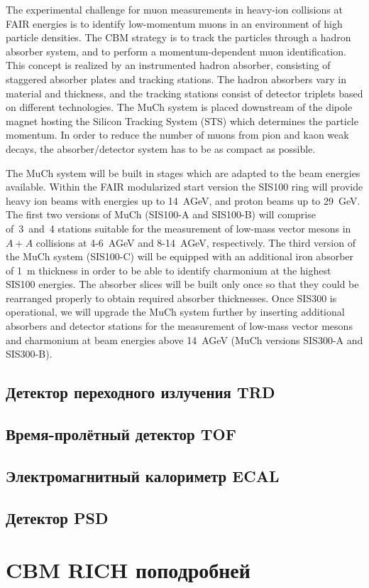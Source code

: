 The experimental challenge for muon measurements in heavy-ion collisions at FAIR energies is to identify low-momentum muons in an environment of high particle densities. The CBM strategy is to track the particles through a hadron absorber system, and to perform a momentum-dependent muon identification. This concept is realized by an instrumented hadron absorber, consisting of staggered absorber plates and tracking stations. The hadron absorbers vary in material and thickness, and the tracking stations consist of detector triplets based on different technologies. The MuCh system is placed downstream of the dipole magnet hosting the Silicon Tracking System (STS) which determines the particle momentum. In order to reduce the number of muons from pion and kaon weak decays, the absorber/detector system has to be as compact as possible.

The MuCh system will be built in stages which are adapted to the beam energies available. Within the FAIR modularized start version the SIS100 ring will provide heavy ion beams with energies up to 14~AGeV, and proton beams up to 29~GeV. The first two versions of MuCh (SIS100-A and SIS100-B) will comprise of~3~and~4 stations suitable for the measurement of low-mass vector mesons in $ A + A $ collisions at 4-6~AGeV and 8-14~AGeV, respectively. The third version of the MuCh system (SIS100-C) will be equipped with an additional iron absorber of 1~m thickness in order to be able to identify charmonium at the highest SIS100 energies. The absorber slices will be built only once so that they could be rearranged properly to obtain required absorber thicknesses. Once SIS300 is operational, we will upgrade the MuCh system further by inserting additional absorbers and detector stations for the measurement of low-mass vector mesons and charmonium at beam energies above 14~AGeV (MuCh versions SIS300-A and SIS300-B).

\subsection{Детектор переходного излучения TRD}\label{sec:secTRD}

\subsection{Время-пролётный детектор TOF}\label{sec:secTOF}

\subsection{Электромагнитный калориметр ECAL}\label{sec:secECAL}

\subsection{Детектор PSD}\label{sec:secPSD}

\section{CBM RICH поподробней}